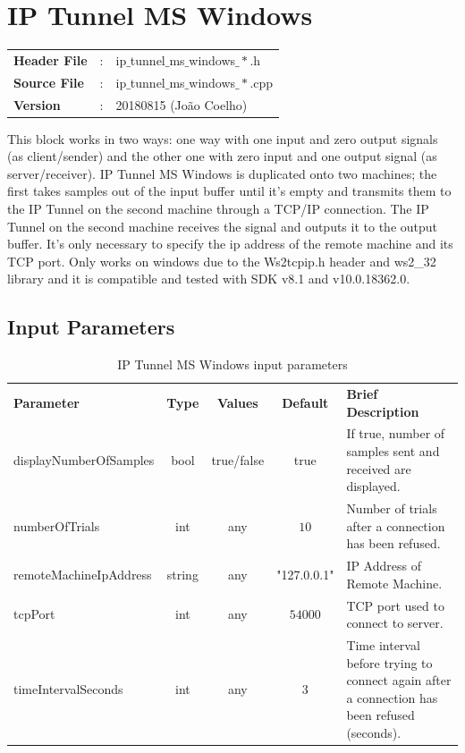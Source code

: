 \clearpage

\section{IP Tunnel MS Windows}

\begin{tcolorbox}	
	\begin{tabular}{p{2.75cm} p{0.2cm} p{10.5cm}} 	
		\textbf{Header File}   &:& ip$\_$tunnel$\_$ms$\_$windows$\_*$.h \\
		\textbf{Source File}   &:& ip$\_$tunnel$\_$ms$\_$windows$\_*$.cpp \\
        \textbf{Version}       &:& 20180815 (Jo\~ao Coelho) \\
	\end{tabular}
\end{tcolorbox}

This block works in two ways: one way with one input and zero output signals (as client/sender) and the other one with zero input and one output signal (as server/receiver).
IP Tunnel MS Windows is duplicated onto two machines; the first takes samples out of the input buffer until it's empty and transmits them to the IP Tunnel on the second machine through a TCP/IP connection. The IP Tunnel on the second machine receives the signal and outputs it to the output buffer.
It's only necessary to specify the ip address of the remote machine and its TCP port.
Only works on windows due to the Ws2tcpip.h header and ws2\_32 library and it is compatible and tested with SDK v8.1 and v10.0.18362.0.

\subsection*{Input Parameters}

\begin{table}[h]
	\centering
	\begin{tabular}{|l|c|c|c|p{50mm}|}
		\cline{1-5}
		\textbf{Parameter} & \textbf{Type} & \textbf{Values} &   \textbf{Default}& \textbf{Brief Description} \\ \cline{1-5}
		
        displayNumberOfSamples & bool & true/false & true & If true, number of samples sent and received are displayed.\\ \cline{1-5}
		numberOfTrials & int & any & $10$ & Number of trials after a connection has been refused.\\ \cline{1-5}
		remoteMachineIpAddress & string & any & "127.0.0.1" & IP Address of Remote Machine.\\ \cline{1-5}
		tcpPort & int & any & $54000$ & TCP port used to connect to server.\\ \cline{1-5}
		timeIntervalSeconds & int & any & $3$ & Time interval before trying to connect again after a connection has been refused (seconds).\\ \cline{1-5}
	\end{tabular}
	\caption{IP Tunnel MS Windows input parameters}
	\label{table:ipt_in_par}
\end{table}

